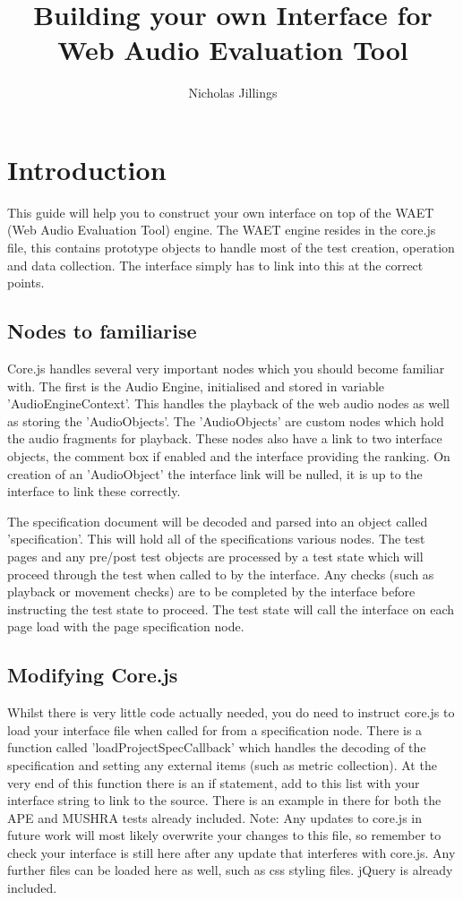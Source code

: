 \documentclass[11pt, oneside]{article}   	%
\title{Building your own Interface for\\ Web Audio Evaluation Tool}
\author{Nicholas Jillings}
\date{}							%
\begin{document}
\maketitle

\section{Introduction}
This guide will help you to construct your own interface on top of the WAET (Web Audio Evaluation Tool) engine. The WAET engine resides in the core.js file, this contains prototype objects to handle most of the test creation, operation and data collection. The interface simply has to link into this at the correct points.

\subsection{Nodes to familiarise}
Core.js handles several very important nodes which you should become familiar with. The first is the Audio Engine, initialised and stored in variable 'AudioEngineContext'. This handles the playback of the web audio nodes as well as storing the 'AudioObjects'. The 'AudioObjects' are custom nodes which hold the audio fragments for playback. These nodes also have a link to two interface objects, the comment box if enabled and the interface providing the ranking. On creation of an 'AudioObject' the interface link will be nulled, it is up to the interface to link these correctly.

The specification document will be decoded and parsed into an object called 'specification'. This will hold all of the specifications various nodes. The test pages and any pre/post test objects are processed by a test state which will proceed through the test when called to by the interface. Any checks (such as playback or movement checks) are to be completed by the interface before instructing the test state to proceed. The test state will call the interface on each page load with the page specification node.

\subsection{Modifying Core.js}
Whilst there is very little code actually needed, you do need to instruct core.js to load your interface file when called for from a specification node. There is a function called 'loadProjectSpecCallback' which handles the decoding of the specification and setting any external items (such as metric collection). At the very end of this function there is an if statement, add to this list with your interface string to link to the source. There is an example in there for both the APE and MUSHRA tests already included. Note: Any updates to core.js in future work will most likely overwrite your changes to this file, so remember to check your interface is still here after any update that interferes with core.js.
Any further files can be loaded here as well, such as css styling files. jQuery is already included.
\end{document}
